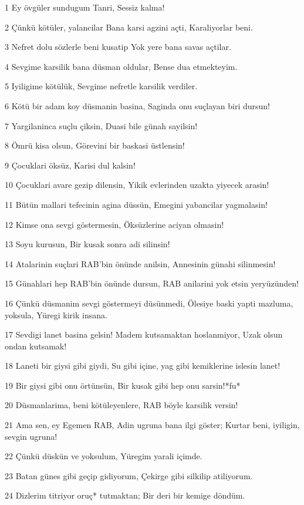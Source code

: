 \par 1 Ey övgüler sundugum Tanri, Sessiz kalma!
\par 2 Çünkü kötüler, yalancilar Bana karsi agzini açti, Karaliyorlar beni.
\par 3 Nefret dolu sözlerle beni kusatip Yok yere bana savas açtilar.
\par 4 Sevgime karsilik bana düsman oldular, Bense dua etmekteyim.
\par 5 Iyiligime kötülük, Sevgime nefretle karsilik verdiler.
\par 6 Kötü bir adam koy düsmanin basina, Saginda onu suçlayan biri dursun!
\par 7 Yargilaninca suçlu çiksin, Duasi bile günah sayilsin!
\par 8 Ömrü kisa olsun, Görevini bir baskasi üstlensin!
\par 9 Çocuklari öksüz, Karisi dul kalsin!
\par 10 Çocuklari avare gezip dilensin, Yikik evlerinden uzakta yiyecek arasin!
\par 11 Bütün mallari tefecinin agina düssün, Emegini yabancilar yagmalasin!
\par 12 Kimse ona sevgi göstermesin, Öksüzlerine aciyan olmasin!
\par 13 Soyu kurusun, Bir kusak sonra adi silinsin!
\par 14 Atalarinin suçlari RAB'bin önünde anilsin, Annesinin günahi silinmesin!
\par 15 Günahlari hep RAB'bin önünde dursun, RAB anilarini yok etsin yeryüzünden!
\par 16 Çünkü düsmanim sevgi göstermeyi düsünmedi, Ölesiye baski yapti mazluma, yoksula, Yüregi kirik insana.
\par 17 Sevdigi lanet basina gelsin! Madem kutsamaktan hoslanmiyor, Uzak olsun ondan kutsamak!
\par 18 Laneti bir giysi gibi giydi, Su gibi içine, yag gibi kemiklerine islesin lanet!
\par 19 Bir giysi gibi onu örtünsün, Bir kusak gibi hep onu sarsin!*fu*
\par 20 Düsmanlarima, beni kötüleyenlere, RAB böyle karsilik versin!
\par 21 Ama sen, ey Egemen RAB, Adin ugruna bana ilgi göster; Kurtar beni, iyiligin, sevgin ugruna!
\par 22 Çünkü düskün ve yoksulum, Yüregim yarali içimde.
\par 23 Batan günes gibi geçip gidiyorum, Çekirge gibi silkilip atiliyorum.
\par 24 Dizlerim titriyor oruç* tutmaktan; Bir deri bir kemige döndüm.
